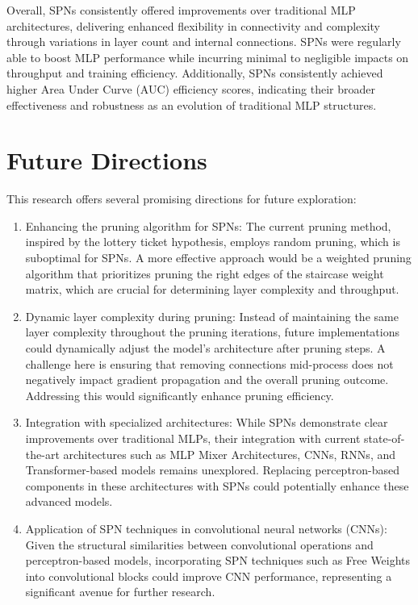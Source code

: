 Overall, SPNs consistently offered improvements over traditional MLP architectures, delivering enhanced flexibility in connectivity and complexity through variations in layer count and internal connections. SPNs were regularly able to boost MLP performance while incurring minimal to negligible impacts on throughput and training efficiency. Additionally, SPNs consistently achieved higher Area Under Curve (AUC) efficiency scores, indicating their broader effectiveness and robustness as an evolution of traditional MLP structures.


\section{Future Directions}

This research offers several promising directions for future exploration:

\begin{enumerate}
    \item Enhancing the pruning algorithm for SPNs: The current pruning method, inspired by the lottery ticket hypothesis, employs random pruning, which is suboptimal for SPNs. A more effective approach would be a weighted pruning algorithm that prioritizes pruning the right edges of the staircase weight matrix, which are crucial for determining layer complexity and throughput.    
    \item Dynamic layer complexity during pruning: Instead of maintaining the same layer complexity throughout the pruning iterations, future implementations could dynamically adjust the model's architecture after pruning steps. A challenge here is ensuring that removing connections mid-process does not negatively impact gradient propagation and the overall pruning outcome. Addressing this would significantly enhance pruning efficiency.
    \item Integration with specialized architectures: While SPNs demonstrate clear improvements over traditional MLPs, their integration with current state-of-the-art architectures such as MLP Mixer Architectures\cite{tolstikhin2021mlp}, CNNs\cite{krizhevsky2012imagenet}, RNNs\cite{lipton2015critical}, and Transformer-based models\cite{vaswani2017attention} remains unexplored. Replacing perceptron-based components in these architectures with SPNs could potentially enhance these advanced models.
    \item Application of SPN techniques in convolutional neural networks (CNNs): Given the structural similarities between convolutional operations and perceptron-based models, incorporating SPN techniques such as Free Weights into convolutional blocks could improve CNN performance, representing a significant avenue for further research.
\end{enumerate}
